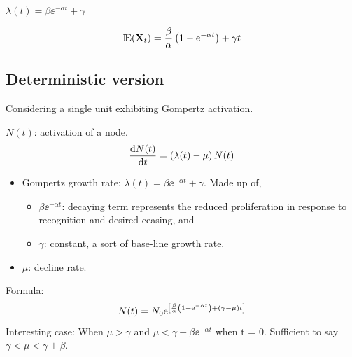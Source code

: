 $\lambda(t) = \beta \ee^{-\alpha t} + \gamma$


$${\rm I}\!{\rm E}({{\bf X}_t}) = \frac{\beta}{\alpha} \left(1 - {\rm e}^{-\alpha t}\right) + \gamma t$$



\subsection*{Deterministic version}

Considering a single unit exhibiting Gompertz activation.\par

\vspace{5pt}

\noindent
$N(t)$: activation of a node.
$$\displaystyle\frac{{\rm d} N(t)}{{\rm d} t} = \left(\lambda(t) - \mu\right) N(t)$$
\begin{itemize}
\item Gompertz growth rate: $\lambda(t) = \beta \ee^{-\alpha t} + \gamma$. Made up of,
\begin{itemize}
\item $\beta \ee^{-\alpha t}$: decaying term represents the reduced proliferation in response to recognition and desired ceasing, and
\item $\gamma$: constant, a sort of base-line growth rate. 
\end{itemize}
\item $\mu$: decline rate.
\end{itemize}
Formula: 
$$N(t) = N_0 {\rm e}^{\left[\frac{\beta}{\alpha} \left(1 - {\rm e}^{-\alpha t} \right) + (\gamma - \mu) t \right]  }$$
Interesting case: When $\mu > \gamma$ and $\mu < \gamma + \beta \ee^{-\alpha t}$ when t = 0. Sufficient to say $\gamma < \mu < \gamma + \beta$.











































